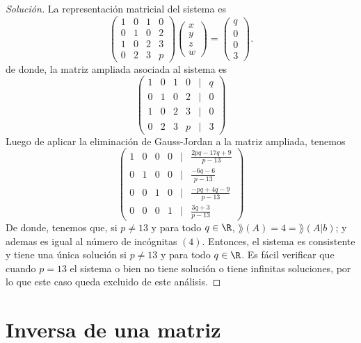 \documentclass[a4,11pt]{aleph-notas}
\begin{document}
\begin{proof}[Solución]\hspace{0pt}
    La representación matricial del sistema es
    \[
    \begin{pmatrix}
                1&0&1&0\\0&1&0&2\\1&0&2&3\\0&2&3&p
                \end{pmatrix}
                \begin{pmatrix}
                x \\ y\\ z \\ w
                \end{pmatrix}
                =
                \begin{pmatrix}
                q \\ 0\\ 0\\ 3
                \end{pmatrix}.
    \]
    de donde, la matriz ampliada asociada al sistema es
    \[
                \begin{pmatrix}
                1&0&1&0&|&q\\
                0&1&0&2&|& 0\\
                1&0&2&3&|& 0\\
                0&2&3&p&|& 3
                \end{pmatrix} 
    \]
    Luego de aplicar la eliminación de Gauss-Jordan a la matriz ampliada, tenemos 
    \[
                \begin{pmatrix}
                1&0&0&0&|&\frac{2pq-17q+9}{p-13}\\
                0&1&0&0&|& \frac{-6q-6}{p-13}\\
                0&0&1&0&|& \frac{-pq+4q-9}{p-13}\\
                0&0&0&1&|& \frac{3q+3}{p-13}
                \end{pmatrix} 
    \]
    De donde, tenemos que, si $p \neq 13$ y para todo $q \in \R$, $\rang(A)=4 = \rang(A|b)$; y ademas es igual al número de incógnitas $(4)$. Entonces, el sistema es consistente y tiene una única solución si $p \neq 13$ y para todo $q \in \R$. Es fácil verificar que cuando $p=13$ el sistema o bien no tiene solución o tiene infinitas soluciones, por lo que este caso queda excluido de este análisis.
\end{proof}


\section{Inversa de una matriz}
\end{document}

